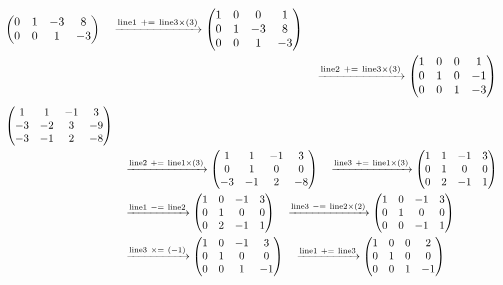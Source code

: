 \documentclass{ltjsarticle}
\begin{document}
\begin{align*}
\begin{pmatrix}
 0 & 1 & - 3 & 8\\
 0 & 0 & 1 & - 3
\end{pmatrix}\ \ \ \xrightarrow{ \text{line} 1 \ +=\  \text{line} 3 \times\left( 3 \right)} %
\begin{pmatrix}
 1 & 0 & 0 & 1\\
 0 & 1 & - 3 & 8\\
 0 & 0 & 1 & - 3
\end{pmatrix}\allowdisplaybreaks\\
 &\ \ \ \xrightarrow{ \text{line} 2 \ +=\  \text{line} 3 \times\left( 3 \right)} %
\begin{pmatrix}
 1 & 0 & 0 & 1\\
 0 & 1 & 0 & -1\\
 0 & 0 & 1 & - 3
\end{pmatrix}
\end{align*}
\begin{align*}
\begin{pmatrix}
 1 & 1 & -1 & 3\\
 - 3 & - 2 & 3 & - 9\\
 - 3 & -1 & 2 & - 8
\end{pmatrix}\\
 &\ \ \ \xrightarrow{ \text{line} 2 \ +=\  \text{line} 1 \times\left( 3 \right)} %
\begin{pmatrix}
 1 & 1 & -1 & 3\\
 0 & 1 & 0 & 0\\
 - 3 & -1 & 2 & - 8
\end{pmatrix}
 \ \ \ \xrightarrow{ \text{line} 3 \ +=\  \text{line} 1 \times\left( 3 \right)} %
\begin{pmatrix}
 1 & 1 & -1 & 3\\
 0 & 1 & 0 & 0\\
 0 & 2 & -1 & 1
\end{pmatrix}\allowdisplaybreaks\\
 &\ \ \ \xrightarrow{ \text{line} 1 \ -=\  \text{line} 2 } %
\begin{pmatrix}
 1 & 0 & -1 & 3\\
 0 & 1 & 0 & 0\\
 0 & 2 & -1 & 1
\end{pmatrix}
 \ \ \ \xrightarrow{ \text{line} 3 \ -=\  \text{line} 2 \times\left( 2 \right)} %
\begin{pmatrix}
 1 & 0 & -1 & 3\\
 0 & 1 & 0 & 0\\
 0 & 0 & -1 & 1
\end{pmatrix}\allowdisplaybreaks\\
 &\ \ \ \xrightarrow{ \text{line} 3 \ \times=\ \left( - 1 \right)} %
\begin{pmatrix}
 1 & 0 & -1 & 3\\
 0 & 1 & 0 & 0\\
 0 & 0 & 1 & -1
\end{pmatrix}
 \ \ \ \xrightarrow{ \text{line} 1 \ +=\  \text{line} 3 } %
\begin{pmatrix}
 1 & 0 & 0 & 2\\
 0 & 1 & 0 & 0\\
 0 & 0 & 1 & -1
\end{pmatrix}
\end{align*}
\end{document}
